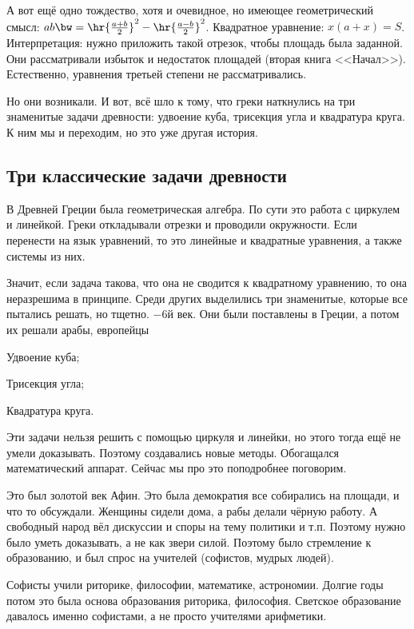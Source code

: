 \documentclass[a4paper,oneside,fleqn,10pt]{article}
\begin{document}
А вот ещё одно тождество, хотя и очевидное, но имеющее геометрический
смысл: $ab \bw= \hr{\frac{a+b}{2}}^2 - \hr{\frac{a-b}{2}}^2$.
Квадратное уравнение: $x(a+x) = S$.  Интерпретация: нужно приложить
такой отрезок, чтобы площадь была заданной.  Они рассматривали избыток
и недостаток площадей (вторая книга <<Начал>>).  Естественно,
уравнения третьей степени не рассматривались.

Но они возникали. И вот, всё шло к тому, что греки наткнулись на три
знаменитые задачи древности: удвоение куба, трисекция угла и
квадратура круга. К ним мы и переходим, но это уже другая история.


\subsection{Три классические задачи древности}

В Древней Греции была геометрическая алгебра. По сути это работа с
циркулем и линейкой. Греки откладывали отрезки и проводили
окружности. Если перенести на язык уравнений, то это линейные и
квадратные уравнения, а также системы из них.

Значит, если задача такова, что она не сводится к квадратному
уравнению, то она неразрешима в принципе.  Среди других выделились три
знаменитые, которые все пытались решать, но тщетно.  $-6$й век. Они
были поставлены в Греции, а потом их решали арабы, европейцы\etc

\begin{items}{-3}
\item Удвоение куба;
\item Трисекция угла;
\item Квадратура круга.
\end{items}

Эти задачи нельзя решить с помощью циркуля и линейки, но этого тогда
ещё не умели доказывать.  Поэтому создавались новые методы. Обогащался
математический аппарат.  Сейчас мы про это поподробнее поговорим.

Это был золотой век Афин. Это была демократия все собирались на
площади, и что то обсуждали. Женщины сидели дома, а рабы делали чёрную
работу.  А свободный народ вёл дискуссии и споры на тему политики и
т.п.  Поэтому нужно было уметь доказывать, а не как звери силой.
Поэтому было стремление к образованию, и был спрос на учителей
(софистов, мудрых людей).

Софисты учили риторике, философии, математике, астрономии. Долгие годы
потом это была основа образования риторика, философия. Светское
образование давалось именно софистами, а не просто учителями
арифметики.
\end{document}
